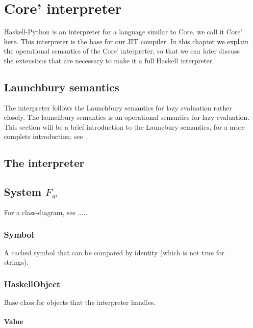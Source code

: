 



\chapter{Core' interpreter}

Haskell-Python is an interpreter for a language similar to Core, we call it Core' here.
This interpreter is the base for our JIT compiler. In this chapter we explain the 
operational semantics of the Core' interpreter, so that we can later discuss the 
extensions that are necessary to make it a full Haskell interpreter.

\section*{Launchbury semantics}

The interpreter follows the Launchbury semantics for lazy evaluation rather closely.
The launchbury semantics is an operational semantics for lazy evaluation. This section
will be a brief introduction to the Launcbury semantics, for a more complete introduction;
see \cite{launchbury1993natural}. 

\section*{The interpreter}


\section*{System $F_w$}

For a class-diagram, see .....

\subsection*{Symbol}

A cached symbol that can be compared by identity (which is not true for strings).

\subsection*{HaskellObject}

Base class for objects that the interpreter handles.

\subsubsection*{Value}

